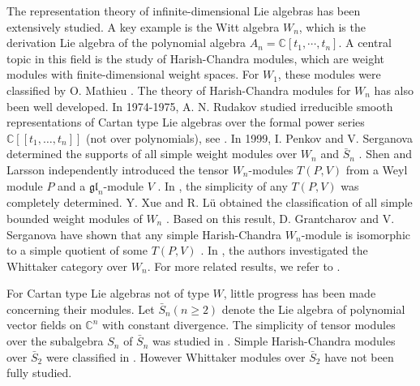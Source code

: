 \documentclass[12pt,a4paper]{amsart}
\def\C{\mathbb{C}}
\def\gl{\mathfrak{gl}}
\begin{document}
The representation theory of infinite-dimensional Lie algebras has been extensively studied.
A key example is the Witt algebra  $W_{n}$, which is the derivation Lie algebra of the polynomial algebra $A_n=\mathbb{C}[t_1, \cdots, t_n]$.
A central topic in this field is the study of Harish-Chandra modules, which are weight modules with finite-dimensional weight spaces. For $W_1$, these modules were  classified by O. Mathieu \cite{OMa}. The theory of Harish-Chandra modules for $W_{n}$ has also been well developed.
 In 1974-1975, A. N. Rudakov studied  irreducible smooth representations of Cartan type Lie algebras over the formal power series $\C[[t_1,\dots,t_n]]$ (not over polynomials), see \cite{R1,R2}.
 In 1999, I. Penkov and V. Serganova determined the supports of all simple weight modules over $W_n$ and $\bar{S}_n$ \cite{IV}.
 Shen and Larsson independently introduced  the tensor $W_n$-modules $T(P,V)$ from a Weyl module $P$ and a $\gl_n$-module $V$ \cite{TAL,GS}.
 In \cite{GRK}, the simplicity of any $T(P,V)$ was completely determined.
 Y. Xue and R. L\"{u} obtained the classification of all simple bounded weight modules of $W_n$ \cite{YR}.
 Based on this result, D. Grantcharov and V. Serganova have shown that any simple Harish-Chandra $W_n$-module is isomorphic to a simple quotient of some $T(P,V)$ \cite{DV}.
 In \cite{YG}, the authors investigated the Whittaker category over $W_n$. For more related results, we refer to \cite{YV,XGRK,RK,YSu}.

For Cartan type Lie algebras not of type $W$, little progress has been made concerning their modules. 
Let $\bar{S}_n(n\geq2)$ denote the Lie algebra of polynomial vector fields on $\mathbb{C}^n$  with constant divergence. The simplicity of tensor modules over the subalgebra  $S_n$ of  $\bar{S}_n$ was studied in \cite{BXYK, HL2, XXZ}.
Simple Harish-Chandra modules over $\bar{S}_2$ were classified in \cite{HL1}.
However Whittaker modules over $\bar{S}_2$ have not been fully studied.
\end{document}
